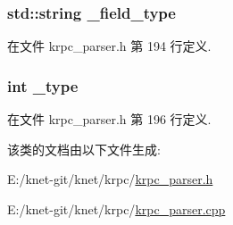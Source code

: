 \hypertarget{classkrpc__field__t_a0ced688ec8ac2ed6189f88fe56a88df4}{}
\subsubsection[{\+\_\+field\+\_\+type}]{\setlength{\rightskip}{0pt plus 5cm}std\+::string \+\_\+field\+\_\+type\hspace{0.3cm}{\ttfamily [private]}}\label{classkrpc__field__t_a0ced688ec8ac2ed6189f88fe56a88df4}


在文件 krpc\+\_\+parser.\+h 第 194 行定义.

\hypertarget{classkrpc__field__t_a4a8a31fad0e6b95531e63101dea58c4b}{}
\subsubsection[{\+\_\+type}]{\setlength{\rightskip}{0pt plus 5cm}int \+\_\+type\hspace{0.3cm}{\ttfamily [private]}}\label{classkrpc__field__t_a4a8a31fad0e6b95531e63101dea58c4b}


在文件 krpc\+\_\+parser.\+h 第 196 行定义.



该类的文档由以下文件生成\+:\begin{DoxyCompactItemize}
\item 
E\+:/knet-\/git/knet/krpc/\hyperlink{krpc__parser_8h}{krpc\+\_\+parser.\+h}\item 
E\+:/knet-\/git/knet/krpc/\hyperlink{krpc__parser_8cpp}{krpc\+\_\+parser.\+cpp}\end{DoxyCompactItemize}
